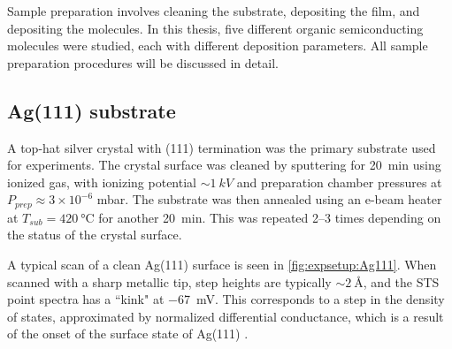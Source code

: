 Sample preparation involves cleaning the substrate, depositing the  film, and depositing the molecules. In this thesis, five different organic semiconducting molecules were studied, each with different deposition parameters. All sample preparation procedures will be discussed in detail.

\subsection*{Ag(111) substrate}

A top-hat silver crystal with (111) termination was the primary substrate used for experiments. The crystal surface was cleaned by sputtering for \SI{20}{\minute} using ionized  gas, with ionizing potential $\sim \SI{1}{kV}$ and preparation chamber pressures at $P_{prep} \approx 3 \times 10^{-6}$ mbar. The substrate was then annealed using an e-beam heater at $T_{sub} = \SI{420}{\celsius}$ for another \SI{20}{\minute}. This was repeated 2--3 times depending on the status of the crystal surface.

A typical scan of a clean Ag(111) surface is seen in \autoref{fig:expsetup:Ag111}. When scanned with a sharp metallic tip, step heights are typically $\sim\SI{2}{\angstrom}$, and the \ac{STS} point spectra has a ``kink" at \SI{-67}{mV}. This corresponds to a step in the density of states, approximated by normalized differential conductance, which is a result of the onset of the surface state of Ag(111) \citep{hovel2001modification}.

